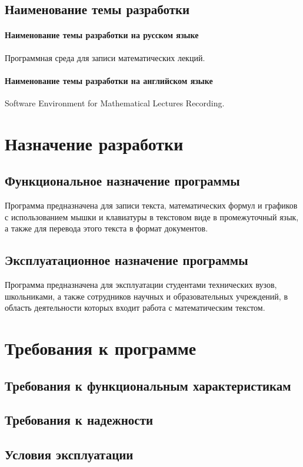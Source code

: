 \documentclass[techtask]{espd}
\begin{document}
\subsection{Наименование темы разработки}
\paragraph{Наименование темы разработки на русском языке}
Программная среда для записи математических лекций.

\paragraph{Наименование темы разработки на английском языке}
Software Environment for Mathematical Lectures Recording.

\section{Назначение разработки}
\subsection{Функциональное назначение программы}
Программа предназначена для записи текста, математических формул и графиков с использованием мышки и клавиатуры в текстовом виде в промежуточный язык, а также для перевода этого текста в формат документов.

\subsection{Эксплуатационное назначение программы}
Программа предназначена для эксплуатации студентами технических вузов, школьниками, а также сотрудников научных и образовательных учреждений, в область деятельности которых входит работа с математическим текстом.

\section{Требования к программе}
\subsection{Требования к функциональным характеристикам}
\subsection{Требования к надежности}
\subsection{Условия эксплуатации}
\end{document}
